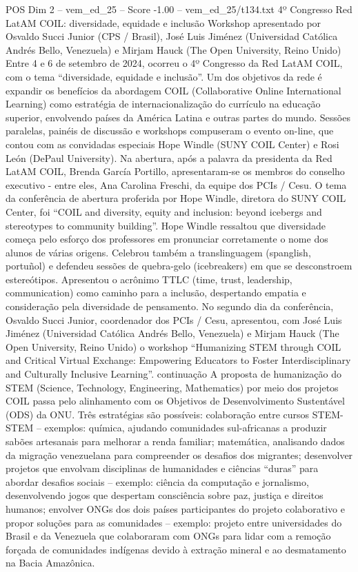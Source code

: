\begin{textsample}{POS Dim 2 – vem\_ed\_25 – Score -1.00 – vem\_ed\_25/t134.txt}  \label{ex:f2_pos_055}
4º Congresso Red LatAM COIL: diversidade, equidade e inclusão Workshop apresentado por Osvaldo Succi Junior (CPS / Brasil), José Luis Jiménez (Universidad Católica Andrés Bello, Venezuela) e Mirjam Hauck (The Open University, Reino Unido) Entre 4 e 6 de setembro de 2024, ocorreu o 4º Congresso da Red LatAM COIL, com o tema “diversidade, equidade e inclusão”.
Um dos objetivos da rede é expandir os benefícios da abordagem COIL (Collaborative Online International Learning) como estratégia de internacionalização do currículo na educação superior, envolvendo países da América Latina e outras partes do mundo.
Sessões paralelas, painéis de discussão e workshops compuseram o evento on-line, que contou com as convidadas especiais Hope Windle (SUNY COIL Center) e Rosi León (DePaul University).
Na abertura, após a palavra da presidenta da Red LatAM COIL, Brenda García Portillo, apresentaram-se os membros do conselho executivo - entre eles, Ana Carolina Freschi, da equipe dos PCIs / Cesu.
O tema da conferência de abertura proferida por Hope Windle, diretora do SUNY COIL Center, foi “COIL and diversity, equity and inclusion: beyond icebergs and stereotypes to community building”.
Hope Windle ressaltou que diversidade começa pelo esforço dos professores em pronunciar corretamente o nome dos alunos de várias origens.
Celebrou também a translinguagem (spanglish, portuñol) e defendeu sessões de quebra-gelo (icebreakers) em que se desconstroem estereótipos.
Apresentou o acrônimo TTLC (time, trust, leadership, communication) como caminho para a inclusão, despertando empatia e consideração pela diversidade de pensamento.
No segundo dia da conferência, Osvaldo Succi Junior, coordenador dos PCIs / Cesu, apresentou, com José Luis Jiménez (Universidad Católica Andrés Bello, Venezuela) e Mirjam Hauck (The Open University, Reino Unido) o workshop “Humanizing STEM through COIL and Critical Virtual Exchange: Empowering Educators to Foster Interdisciplinary and Culturally Inclusive Learning”. continuação A proposta de humanização do STEM (Science, Technology, Engineering, Mathematics) por meio dos projetos COIL passa pelo alinhamento com os Objetivos de Desenvolvimento Sustentável (ODS) da ONU.
Três estratégias são possíveis: colaboração entre cursos STEM-STEM – exemplos: química, ajudando comunidades sul-africanas a produzir sabões artesanais para melhorar a renda familiar; matemática, analisando dados da migração venezuelana para compreender os desafios dos migrantes; desenvolver projetos que envolvam disciplinas de humanidades e ciências “duras” para abordar desafios sociais – exemplo: ciência da computação e jornalismo, desenvolvendo jogos que despertam consciência sobre paz, justiça e direitos humanos; envolver ONGs dos dois países participantes do projeto colaborativo e propor soluções para as comunidades – exemplo: projeto entre universidades do Brasil e da Venezuela que colaboraram com ONGs para lidar com a remoção forçada de comunidades indígenas devido à extração mineral e ao desmatamento na Bacia Amazônica.

\end{textsample}
